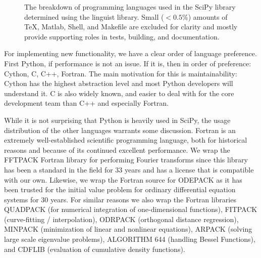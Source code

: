 \documentclass[fleqn,10pt]{wlscirep}
\begin{document}
    \begin{figure}[H]
        \centering

        \caption{The breakdown of programming languages used in the
	         SciPy library determined using the linguist library.
		 Small ($<0.5 \%$) amounts of TeX, Matlab, Shell,
		 and Makefile are excluded for clarity and mostly
		 provide supporting roles in tests, building, and
		 documentation.}
        \label{fig:linguist}
    \end{figure}

For implementing new functionality, we have a clear order of language preference.
First Python, if performance is not an issue. If it is, then in order of
preference: Cython, C, C++, Fortran. The main motivation for this is 
maintainability: Cython has the highest abstraction level and most 
Python developers will understand it. C is also widely known,
and easier to deal with for the core development team
than C++ and especially Fortran.

While it is not surprising that Python is heavily used in SciPy, the
usage distribution of the other languages warrants some discussion. Fortran
is an extremely well-established scientific programming language, both
for historical reasons and because of its continued excellent
performance\cite{Koelbel:1993:HPF:562354}. We
wrap the FFTPACK Fortran library for performing Fourier
transforms\cite{SWARZTRAUBER198445, SWARZTRAUBER198251} since
this library has been a standard in the field for 33 years and has a license
that is compatible with our own. Likewise, we wrap the Fortran source
for ODEPACK\cite{citeulike:2644528} as it has been  trusted for the initial 
value problem for ordinary differential equation systems for 30 years. For
similar reasons we also wrap the Fortran libraries QUADPACK\cite{1983qspa.book.....P} (for numerical
integration of one-dimensional functions), FITPACK\cite{Dierckx:1993:CSF:151103} (curve-fitting /
interpolation), ODRPACK\cite{ODRPACK_Boggs} (orthogonal distance regression),
MINPACK\cite{osti_6997568} (minimization of linear and nonlinear equations),
ARPACK\cite{leh:sor:yan96} (solving large scale eigenvalue problems), 
ALGORITHM 644\cite{Amos:1986:APP:7921.214331} (handling Bessel Functions), and 
CDFLIB\cite{CDFLIB_site} (evaluation of cumulative density functions).
\end{document}
